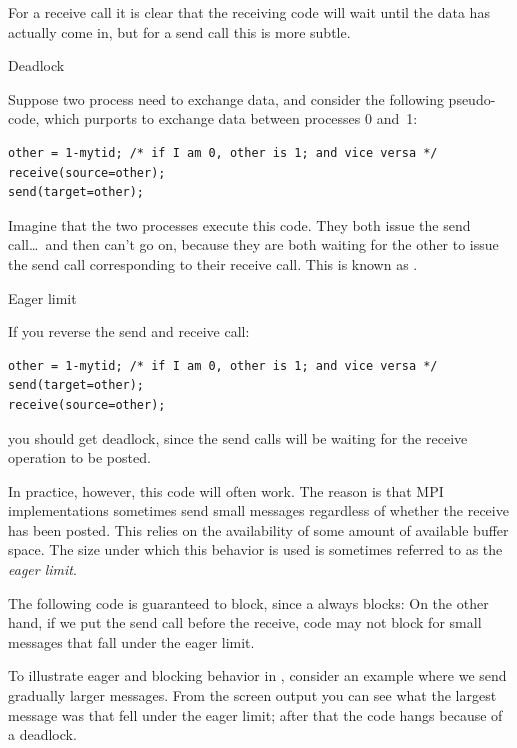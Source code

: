 For a receive call it is clear that the receiving code will wait until
the data has actually come in, but for a send call this is more subtle.

 {Deadlock}

Suppose two process need to exchange data, and consider the following
pseudo-code, which purports to exchange data between processes 0 and~1:
\begin{lstlisting}
other = 1-mytid; /* if I am 0, other is 1; and vice versa */
receive(source=other);
send(target=other);
\end{lstlisting}
Imagine that the two processes execute this code. They both issue the
send call\ldots\ and then can't go on, because they are both waiting
for the other to issue the send call corresponding to their receive call.
This is known as .

 {Eager limit}
\label{sec:eager-limit}

If you reverse the send and receive call:
\begin{lstlisting}
other = 1-mytid; /* if I am 0, other is 1; and vice versa */
send(target=other);
receive(source=other);
\end{lstlisting}
you should get deadlock,
since the send calls will be waiting for the receive operation to be posted.

In practice, however, this code will often work. The reason is that
MPI implementations sometimes send small messages regardless of whether
the receive has been posted. This relies on the availability of
some amount of available buffer space. The size under which this behavior
is used is sometimes referred to as the \emph{eager limit}.

The following code is guaranteed to block, since a 
always blocks:
On the other hand, if we put the send call before the receive,
code may not block for small messages
that fall under the eager limit.

To illustrate eager and blocking behavior in ,
consider an example where we send
gradually larger messages. From the screen output you can see what
the largest message was that fell under the eager limit; after that the code
hangs because of a deadlock.
%
%
%

